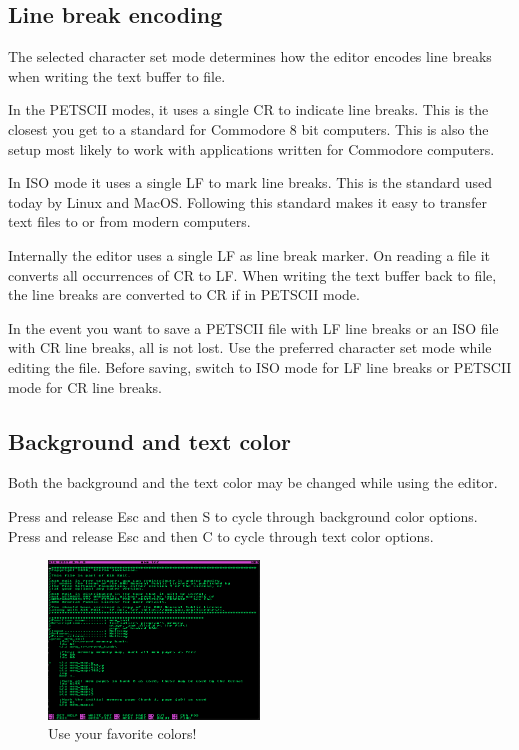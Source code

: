 \documentclass{article}
\begin{document}
    \subsection{Line break encoding}

        The selected character set mode determines how the editor encodes line breaks when writing the
        text buffer to file. 
        
        In the PETSCII modes, it uses a single CR to indicate line breaks. This
        is the closest you get to a standard for Commodore 8 bit computers. This is also the
        setup most likely to work with applications written for Commodore computers.
        
        In ISO mode it uses
        a single LF to mark line breaks. This is the standard used today by Linux and MacOS. Following
        this standard makes it easy to transfer text files to or from modern computers.

        Internally the editor uses a single LF as line break marker. On reading a file it converts
        all occurrences of CR to LF. When writing the text buffer back to file, the line breaks
        are converted to CR if in PETSCII mode.

        In the event you want to save a PETSCII file with LF line breaks or an ISO file with
        CR line breaks, all is not lost. Use the preferred character set mode while
        editing the file. Before saving, switch to ISO mode for LF line breaks or PETSCII mode
        for CR line breaks.

    \subsection{Background and text color}

        Both the background and the text color may be changed while using the editor.

        Press and release Esc and then S to cycle through background color options.
        Press and release Esc and then C to cycle through text color options.

        \begin{figure}[H]
            \caption{Use your favorite colors!}
            \centering\includegraphics[width=0.5\textwidth]{colors.png}
        \end{figure}
       
\end{document}
